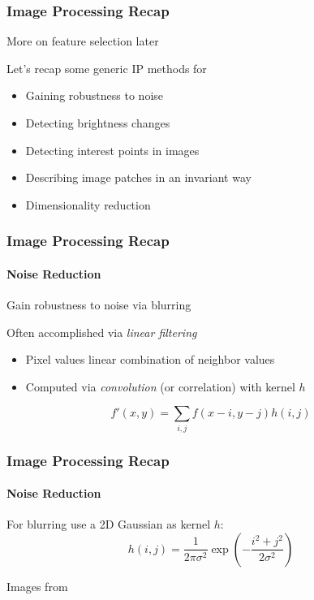 \documentclass[xetex,professionalfont]{beamer}
\begin{document}

\begin{frame}
\frametitle{Image Processing Recap}

More on feature selection later

\bigskip
Let's recap some generic IP methods for
\begin{itemize}
    \item Gaining robustness to noise
    \item Detecting brightness changes
    \item Detecting interest points in images
    \item Describing image patches in an invariant way
    \item Dimensionality reduction
\end{itemize}

\end{frame}


\begin{frame}
\frametitle{Image Processing Recap}
\framesubtitle{Noise Reduction}

Gain robustness to noise via blurring

\bigskip
Often accomplished via \emph{linear filtering}
\begin{itemize}
    \item Pixel values linear combination of neighbor values
    \item Computed via \emph{convolution} (or correlation) with kernel $h$
\end{itemize}

\[
f'(x,y) = \sum_{i,j}f(x-i,y-j)h(i,j) %
\]

\end{frame}


\begin{frame}
\frametitle{Image Processing Recap}
\framesubtitle{Noise Reduction}

For blurring use a 2D Gaussian as kernel $h$: %
\[
h(i,j)=\frac{1}{2\pi\sigma^2}\exp\left(-\frac{i^2+j^2}{2\sigma^2}\right)
\]

\begin{center}
    {\centering Images from \cite{prince12}}
\end{center}

\end{frame}
\end{document}
